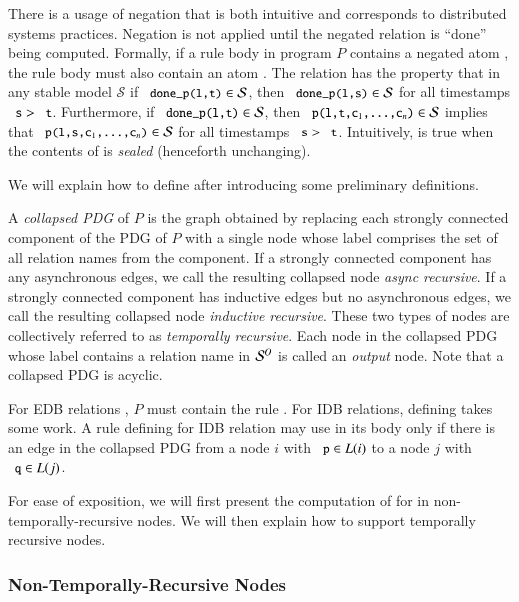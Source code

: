 
There is a usage of negation that is both intuitive and corresponds to distributed systems practices.  Negation is not applied until the negated relation is ``done'' being computed.  Formally, if a rule body in program $P$ contains a negated atom , the rule body must also contain an atom .  The relation  has the property that in any stable model $\mathcal{S}$ if $\dedalus{done_p(l,t)} \in \mathcal{S}$,  then $\dedalus{done_p(l,s)} \in \mathcal{S}$ for all timestamps $\dedalus{s} > \dedalus{t}$.  Furthermore, if $\dedalus{done_p(l,t)} \in \mathcal{S}$, then $\dedalus{p(l,t,c\sub{1},\ldots,c\sub{n})} \in \mathcal{S}$ implies that $\dedalus{p(l,s,c\sub{1},\ldots,c\sub{n})} \in \mathcal{S}$ for all timestamps $\dedalus{s} > \dedalus{t}$.  Intuitively,  is true when the contents of  is {\em sealed} (henceforth unchanging).

We will explain how to define  after introducing some preliminary definitions.

A {\em collapsed PDG} of $P$ is the graph obtained by replacing each strongly
connected component of the PDG of $P$ with a single node whose label comprises
the set of all relation names from the component.  If a strongly connected
component has any asynchronous edges, we call the resulting collapsed node {\em
  async recursive}.  If a strongly connected component has inductive edges but
no asynchronous edges, we call the resulting collapsed node {\em inductive
  recursive}.  These two types of nodes are collectively referred to as {\em
  temporally recursive}.  Each node in the collapsed PDG whose label contains a
relation name in $\mathcal{S}^O$ is called an {\em output} node.  Note that a
collapsed PDG is acyclic.

For EDB relations , $P$ must contain the rule .  For
IDB relations, defining  takes some work.  A rule defining
 for IDB relation  may use  in
its body only if there is an edge in the collapsed PDG from a node $i$ with
$\dedalus{p} \in L(i)$ to a node $j$ with $\dedalus{q} \in L(j)$.

For ease of exposition, we will first present the computation of  for  in non-temporally-recursive nodes.  We will then explain how to support temporally recursive nodes.

\subsubsection{Non-Temporally-Recursive Nodes}

